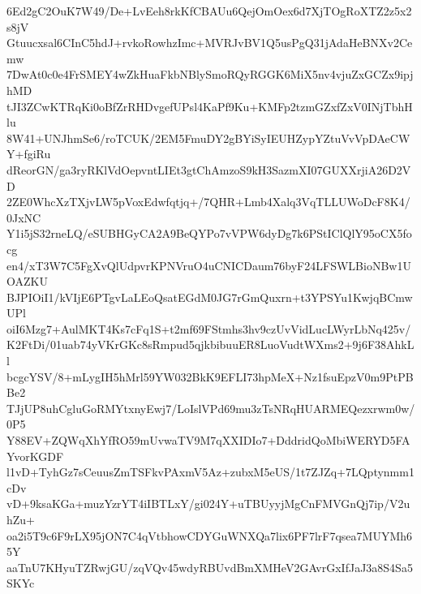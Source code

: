 6Ed2gC2OuK7W49/De+LvEeh8rkKfCBAUu6QejOmOex6d7XjTOgRoXTZ2z5x2s8jV
Gtuucxsal6CInC5hdJ+rvkoRowhzImc+MVRJvBV1Q5usPgQ31jAdaHeBNXv2Cemw
7DwAt0c0e4FrSMEY4wZkHuaFkbNBlySmoRQyRGGK6MiX5nv4vjuZxGCZx9ipjhMD
tJI3ZCwKTRqKi0oBfZrRHDvgefUPsl4KaPf9Ku+KMFp2tzmGZxfZxV0INjTbhHlu
8W41+UNJhmSe6/roTCUK/2EM5FmuDY2gBYiSyIEUHZypYZtuVvVpDAeCWY+fgiRu
dReorGN/ga3ryRKlVdOepvntLIEt3gtChAmzoS9kH3SazmXI07GUXXrjiA26D2VD
2ZE0WhcXzTXjvLW5pVoxEdwfqtjq+/7QHR+Lmb4Xalq3VqTLLUWoDcF8K4/0JxNC
Y1i5jS32rneLQ/eSUBHGyCA2A9BeQYPo7vVPW6dyDg7k6PStIClQlY95oCX5focg
en4/xT3W7C5FgXvQlUdpvrKPNVruO4uCNICDaum76byF24LFSWLBioNBw1UOAZKU
BJPIOiI1/kVIjE6PTgvLaLEoQsatEGdM0JG7rGmQuxrn+t3YPSYu1KwjqBCmwUPl
oiI6Mzg7+AulMKT4Ks7cFq1S+t2mf69FStmhs3hv9czUvVidLucLWyrLbNq425v/
K2FtDi/01uab74yVKrGKc8sRmpud5qjkbibuuER8LuoVudtWXms2+9j6F38AhkLl
bcgcYSV/8+mLygIH5hMrl59YW032BkK9EFLI73hpMeX+Nz1fsuEpzV0m9PtPBBe2
TJjUP8uhCgluGoRMYtxnyEwj7/LoIslVPd69mu3zTsNRqHUARMEQezxrwm0w/0P5
Y88EV+ZQWqXhYfRO59mUvwaTV9M7qXXIDIo7+DddridQoMbiWERYD5FAYvorKGDF
l1vD+TyhGz7sCeuusZmTSFkvPAxmV5Az+zubxM5eUS/1t7ZJZq+7LQptynmm1cDv
vD+9ksaKGa+muzYzrYT4iIBTLxY/gi024Y+uTBUyyjMgCnFMVGnQj7ip/V2uhZu+
oa2i5T9c6F9rLX95jON7C4qVtbhowCDYGuWNXQa7lix6PF7lrF7qsea7MUYMh65Y
aaTnU7KHyuTZRwjGU/zqVQv45wdyRBUvdBmXMHeV2GAvrGxIfJaJ3a8S4Sa5SKYc
